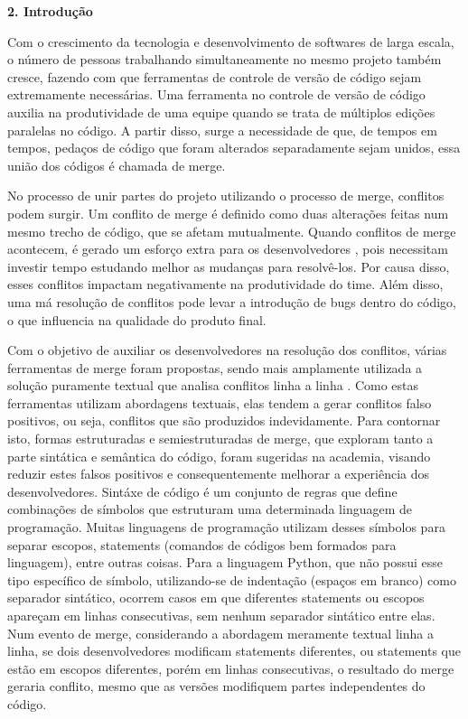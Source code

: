 \begin{flushleft}
	{\textbf{\Large{2. Introdução}}}
\end{flushleft}
\vspace{1cm}

Com o crescimento da tecnologia e desenvolvimento de softwares de larga escala, o número de pessoas trabalhando simultaneamente no mesmo projeto também cresce, fazendo com que ferramentas de controle de versão de código sejam extremamente necessárias. Uma ferramenta no controle de versão de código auxilia na produtividade de uma equipe quando se trata de múltiplos edições paralelas no código. A partir disso, surge a necessidade de que, de tempos em tempos, pedaços de código que foram alterados separadamente sejam unidos, essa união dos códigos é chamada de merge.

No processo de unir partes do projeto utilizando o processo de merge, conflitos podem surgir. Um conflito de merge é definido como duas alterações feitas num mesmo trecho de código, que se afetam mutualmente. Quando conflitos de merge acontecem, é gerado um esforço extra para os desenvolvedores \cite{brindescu2020empirical}, pois necessitam investir tempo estudando melhor as mudanças para resolvê-los. Por causa disso, esses conflitos impactam negativamente na produtividade do time. Além disso, uma má resolução de conflitos pode levar a introdução de bugs dentro do código, o que influencia na qualidade do produto final.

Com o objetivo de auxiliar os desenvolvedores na resolução dos conflitos, várias ferramentas de merge foram propostas, sendo mais amplamente utilizada a solução puramente textual que analisa conflitos linha a linha \cite{khanna2007formal}. Como estas ferramentas utilizam abordagens textuais, elas tendem a gerar conflitos falso positivos, ou seja, conflitos que são produzidos indevidamente. Para contornar isto, formas estruturadas e semiestruturadas de merge, que exploram tanto a parte sintática e semântica do código, foram sugeridas na academia, visando reduzir estes falsos positivos e consequentemente melhorar a experiência dos desenvolvedores. Sintáxe de código é um conjunto de regras que define combinações de símbolos que estruturam uma determinada linguagem de programação. Muitas linguagens de programação utilizam desses símbolos para separar escopos, statements (comandos de códigos bem formados para linguagem), entre outras coisas. Para a linguagem Python, que não possui esse tipo específico de símbolo, utilizando-se de indentação (espaços em branco) como separador sintático, ocorrem casos em que diferentes statements ou escopos apareçam em linhas consecutivas, sem nenhum separador sintático entre elas. Num evento de merge, considerando a abordagem meramente textual linha a linha, se dois desenvolvedores modificam statements diferentes, ou statements que estão em escopos diferentes, porém em linhas consecutivas, o resultado do merge geraria conflito, mesmo que as versões modifiquem partes independentes do código.


